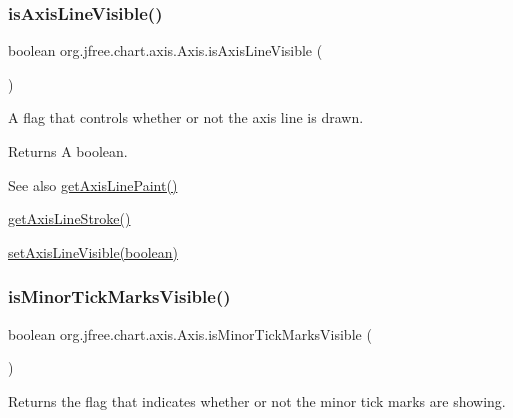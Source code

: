 \subsubsection{\texorpdfstring{is\+Axis\+Line\+Visible()}{isAxisLineVisible()}}
{\footnotesize\ttfamily boolean org.\+jfree.\+chart.\+axis.\+Axis.\+is\+Axis\+Line\+Visible (\begin{DoxyParamCaption}{ }\end{DoxyParamCaption})}

A flag that controls whether or not the axis line is drawn.

\begin{DoxyReturn}{Returns}
A boolean.
\end{DoxyReturn}
\begin{DoxySeeAlso}{See also}
\mbox{\hyperlink{classorg_1_1jfree_1_1chart_1_1axis_1_1_axis_a6d10951b7f082f0857398d5fa30642d2}{get\+Axis\+Line\+Paint()}} 

\mbox{\hyperlink{classorg_1_1jfree_1_1chart_1_1axis_1_1_axis_ab999e7ef49b87ddc75e07eb5658661b5}{get\+Axis\+Line\+Stroke()}} 

\mbox{\hyperlink{classorg_1_1jfree_1_1chart_1_1axis_1_1_axis_a9b25030b0d5848884c269ef1f9a73601}{set\+Axis\+Line\+Visible(boolean)}} 
\end{DoxySeeAlso}
\mbox{\label{classorg_1_1jfree_1_1chart_1_1axis_1_1_axis_ab0512be8dc8bf6d4093d9d7415a57dab}} 
\subsubsection{\texorpdfstring{is\+Minor\+Tick\+Marks\+Visible()}{isMinorTickMarksVisible()}}
{\footnotesize\ttfamily boolean org.\+jfree.\+chart.\+axis.\+Axis.\+is\+Minor\+Tick\+Marks\+Visible (\begin{DoxyParamCaption}{ }\end{DoxyParamCaption})}

Returns the flag that indicates whether or not the minor tick marks are showing.

